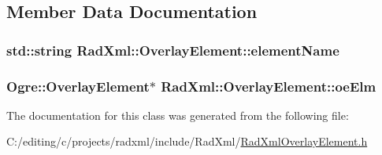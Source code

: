 \subsection{Member Data Documentation}
\hypertarget{class_rad_xml_1_1_overlay_element_a60a70b104dc21f93f6b39abe2208f771}{
\subsubsection[{element\-Name}]{\setlength{\rightskip}{0pt plus 5cm}std\-::string Rad\-Xml\-::\-Overlay\-Element\-::element\-Name\hspace{0.3cm}{\ttfamily [protected]}}}\label{class_rad_xml_1_1_overlay_element_a60a70b104dc21f93f6b39abe2208f771}
\hypertarget{class_rad_xml_1_1_overlay_element_ad1e1b7f9920f00ba26f5e7772d194a78}{
\subsubsection[{oe\-Elm}]{\setlength{\rightskip}{0pt plus 5cm}Ogre\-::\-Overlay\-Element$\ast$ Rad\-Xml\-::\-Overlay\-Element\-::oe\-Elm\hspace{0.3cm}{\ttfamily [protected]}}}\label{class_rad_xml_1_1_overlay_element_ad1e1b7f9920f00ba26f5e7772d194a78}


The documentation for this class was generated from the following file\-:\begin{DoxyCompactItemize}
\item 
C\-:/editing/c/projects/radxml/include/\-Rad\-Xml/\hyperlink{_rad_xml_overlay_element_8h}{Rad\-Xml\-Overlay\-Element.\-h}\end{DoxyCompactItemize}
